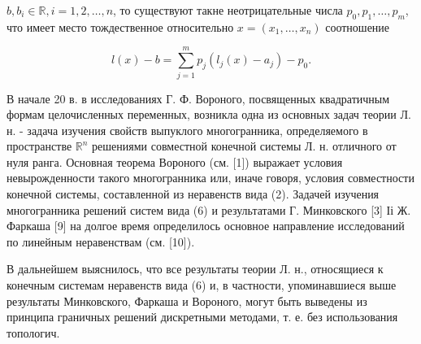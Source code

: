 \documentclass[10pt]{article}
\begin{document}
$b, b_{i} \in \mathbb{R}, i=1,2, \ldots, n$, то существуют такне неотрицательные числа $p_{0}, p_{1}, \ldots, p_{m}$, что имеет место тождественное относительно $x=\left(x_{1}, \ldots, x_{n}\right)$ соотношение



\[

l(x)-b=\sum_{j=1}^{m} p_{j}\left(l_{j}(x)-a_{j}\right)-p_{0} .

\]



В начале 20 в. в исследованиях Г. Ф. Вороного, посвященных квадратичным формам целочисленных переменных, возникла одна из основных задач теории Л. н. - задача изучения свойств выпуклого многогранника, определяемого в пространстве $\mathbb{R}^{n}$ решениями совместной конечной системы Л. н. отличного от нуля ранга. Основная теорема Вороного (см. [1]) выражает условия невырожденности такого многогранника или, иначе говоря, условия совместности конечной системы, составленной из неравенств вида (2). Задачей изучения многогранника решений систем вида (6) и результатами Г. Минковского [3] Іі Ж. Фаркаша [9] на долгое время определилось основное направление исследований по линейным неравенствам (см. [10]).



В дальнейшем выяснилось, что все результаты теории Л. н., относящиеся к конечным системам неравенств вида (6) и, в частности, упоминавшиеся выше результаты Минковского, Фаркаша и Вороного, могут быть выведены из принципа граничных решений дискретными методами, т. е. без использования топологич.
\end{document}
